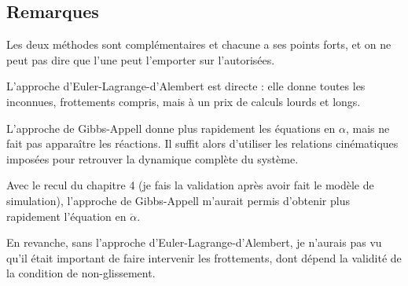 \subsection{Remarques}

\begin{remarque}
    Les deux méthodes sont complémentaires et chacune a ses points
    forts, et on ne peut pas dire que l'une peut l'emporter sur l'autorisées.
    
    L'approche d'Euler-Lagrange-d'Alembert est directe : elle
    donne toutes les inconnues, frottements compris, mais à un prix de
    calculs lourds et longs. 
    
    L'approche de Gibbs-Appell donne plus rapidement
    les équations en $\alpha$, mais ne fait pas apparaître les
    réactions. Il suffit alors d'utiliser les relations cinématiques
    imposées pour retrouver la dynamique complète du système.
\end{remarque}

\begin{remarque}[Recul]
    Avec le recul du chapitre 4 (je fais la validation après avoir fait le modèle de simulation), l'approche de Gibbs-Appell m'aurait
    permis d'obtenir plus rapidement l'équation en $\ddot\alpha$. 
    
    En revanche, sans l'approche d'Euler-Lagrange-d'Alembert, je n'aurais
    pas vu qu'il était important de faire intervenir les frottements,
    dont dépend la validité de la condition de non-glissement. 
\end{remarque}

